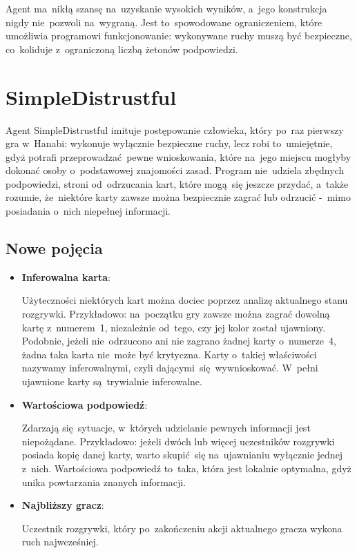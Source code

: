 \documentclass[declaration,shortabstract,inz]{iithesis}
\begin{document}
Agent ma~nikłą szansę na~uzyskanie wysokich wyników, a~jego konstrukcja nigdy nie~pozwoli na~wygraną. Jest to~spowodowane ograniczeniem, które umożliwia programowi funkcjonowanie: wykonywane ruchy muszą być bezpieczne, co~koliduje z~ograniczoną liczbą żetonów podpowiedzi.

\section{SimpleDistrustful}

Agent SimpleDistrustful imituje postępowanie człowieka, który po~raz pierwszy gra w~Hanabi: wykonuje wyłącznie bezpieczne ruchy, lecz robi to~umiejętnie, gdyż potrafi przeprowadzać pewne wnioskowania, które na~jego miejscu mogłyby dokonać osoby o~podstawowej znajomości zasad. Program nie~udziela zbędnych podpowiedzi, stroni od~odrzucania kart, które mogą~się jeszcze przydać, a~także rozumie, że~niektóre karty zawsze można bezpiecznie zagrać lub odrzucić -~mimo posiadania o~nich niepełnej informacji.

\subsection*{Nowe pojęcia}

\begin{itemize}
	\item \textbf{Inferowalna karta}:

	Użyteczności niektórych kart można dociec poprzez analizę aktualnego stanu rozgrywki. Przykładowo: na~początku gry zawsze można zagrać dowolną kartę z~numerem~1, niezależnie od~tego, czy jej kolor został ujawniony. Podobnie, jeżeli nie~odrzucono ani nie zagrano żadnej karty o~numerze~4, żadna taka karta nie~może być krytyczna. Karty o~takiej właściwości nazywamy inferowalnymi, czyli dającymi~się wywnioskować. W~pełni ujawnione karty są~trywialnie inferowalne.
	
	\item \textbf{Wartościowa podpowiedź}:
	
	Zdarzają się~sytuacje, w~których udzielanie pewnych informacji jest niepożądane. Przykładowo: jeżeli dwóch lub więcej uczestników rozgrywki posiada kopię danej karty, warto skupić~się na~ujawnianiu wyłącznie jednej z~nich. Wartościowa podpowiedź to~taka, która jest lokalnie optymalna, gdyż unika powtarzania znanych informacji.
	
	\item \textbf{Najbliższy gracz}:
	
	Uczestnik rozgrywki, który po~zakończeniu akcji aktualnego gracza wykona ruch najwcześniej.
	
\end{itemize}
\end{document}

